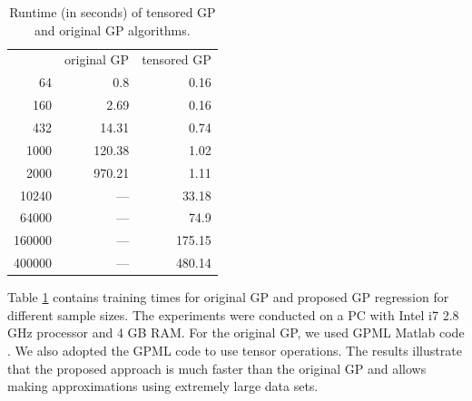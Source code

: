 \begin{table}[t]
  \caption{Runtime (in seconds) of tensored GP and original GP algorithms.}
  \label{tb:runtime}
  \vskip 0.15in
  \begin{center}
    \begin{small}
      \begin{sc}
        \begin{tabular}{rrr}
          \hline
          & original GP   & tensored GP \\
          64     & 0.8    & 0.16 \\
          160    & 2.69   & 0.16 \\
          432    & 14.31  & 0.74 \\
          1000   & 120.38 & 1.02 \\
          2000   & 970.21 & 1.11 \\
          10240  & ---    & 33.18 \\
          64000  & ---    & 74.9 \\
          160000 & ---    & 175.15 \\
          400000 & ---    & 480.14\\
          \hline
        \end{tabular}
      \end{sc}
    \end{small}
  \end{center}
  \vskip -0.1in
\end{table}

Table \ref{tb:runtime} contains training times for
original GP and proposed GP regression for different sample sizes.
The experiments were conducted on a PC with Intel i7 2.8 GHz processor and
4 GB RAM.
For the original GP, we used GPML Matlab code \citep{gpmltoolbox}.
We also adopted the GPML code to use tensor operations.
The results illustrate that the proposed approach is much faster than the original GP
and allows making approximations using extremely large data sets.

